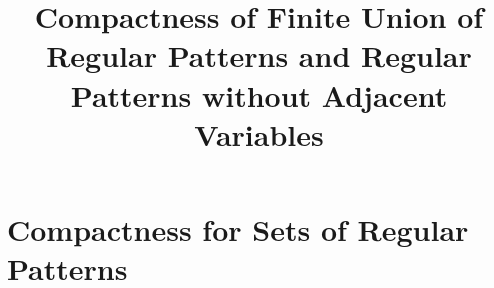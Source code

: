 \documentclass[paper]{ieice}
\title{Compactness of Finite Union of Regular Patterns and Regular Patterns without Adjacent Variables}
\begin{document}
\maketitle










\section{Compactness for Sets of Regular Patterns}












\end{document}
